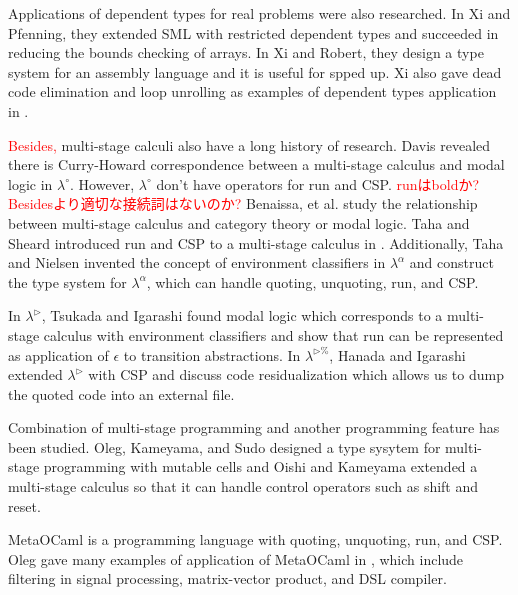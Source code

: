 \documentclass[runningheads]{llncs}
\newcommand{\red}[1]{\textcolor{red}{#1 }}
\newcommand{\LTP}{$\lambda^{\triangleright\%}$\xspace}
\newcommand{\TW}{{\mathop{\triangleright}}}
\begin{document}

  Applications of dependent types for real problems were also researched.
  In Xi and Pfenning\cite{Xi98}, they extended SML with restricted dependent types
  and succeeded in reducing the bounds checking of arrays.
  In Xi and Robert\cite{xi2001dependently}, they design a type system for an assembly language and
  it is useful for spped up.
  Xi also gave dead code elimination and loop unrolling as examples of dependent types application in \cite{xi1999dependent}.


  \red{Besides,} multi-stage calculi also have a long history of research.
  Davis revealed there is Curry-Howard correspondence between a multi-stage calculus and modal logic in $\lambda^\circ$\cite{davies1996temporal}.
  However, $\lambda^\circ$ don't have operators for run and CSP.
  \red{runはboldか? Besidesより適切な接続詞はないのか?}
  Benaissa, et al. \cite{benaissa1999logical} study the relationship between multi-stage calculus and category theory or modal logic.
  Taha and Sheard introduced run and CSP to a multi-stage calculus in \cite{MetaML}.
  Additionally, Taha and Nielsen invented the concept of environment classifiers in $\lambda^\alpha$\cite{taha2003environment} and 
  construct the type system for $\lambda^\alpha$, which can handle quoting, unquoting, run, and CSP.

  In $\lambda^\TW$\cite{Tsukada}, Tsukada and Igarashi found modal logic which corresponds to a multi-stage calculus with environment classifiers and
  show that run can be represented as application of $\epsilon$ to transition abstractions.
  In \LTP\cite{Hanada2014}, Hanada and Igarashi extended $\lambda^\TW$ with CSP and discuss code residualization 
  which allows us to dump the quoted code into an external file.


  Combination of multi-stage programming and another programming feature has been studied.
  Oleg, Kameyama, and Sudo\cite{kiselyov2016refined} designed a type sysytem for multi-stage programming with mutable cells and
  Oishi and Kameyama\cite{oishi2017staging} extended a multi-stage calculus so that it can handle control operators such as shift and reset.


  MetaOCaml is a programming language with quoting, unquoting, run, and CSP.
  Oleg gave many examples of application of MetaOCaml in \cite{8384206}, 
  which include filtering in signal processing, matrix-vector product, and DSL compiler.
\end{document}
